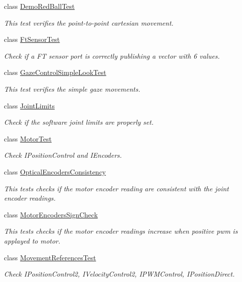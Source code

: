 \begin{DoxyCompactItemize}
class \hyperlink{classDemoRedBallTest}{Demo\+Red\+Ball\+Test}
\begin{DoxyCompactList}\small\item\em This test verifies the point-\/to-\/point cartesian movement. \end{DoxyCompactList}\item 
class \hyperlink{classFtSensorTest}{Ft\+Sensor\+Test}
\begin{DoxyCompactList}\small\item\em Check if a FT sensor port is correctly publishing a vector with 6 values. \end{DoxyCompactList}\item 
class \hyperlink{classGazeControlSimpleLookTest}{Gaze\+Control\+Simple\+Look\+Test}
\begin{DoxyCompactList}\small\item\em This test verifies the simple gaze movements. \end{DoxyCompactList}\item 
class \hyperlink{classJointLimits}{Joint\+Limits}
\begin{DoxyCompactList}\small\item\em Check if the software joint limits are properly set. \end{DoxyCompactList}\item 
class \hyperlink{classMotorTest}{Motor\+Test}
\begin{DoxyCompactList}\small\item\em Check I\+Position\+Control and I\+Encoders. \end{DoxyCompactList}\item 
class \hyperlink{classOpticalEncodersConsistency}{Optical\+Encoders\+Consistency}
\begin{DoxyCompactList}\small\item\em This tests checks if the motor encoder reading are consistent with the joint encoder readings. \end{DoxyCompactList}\item 
class \hyperlink{classMotorEncodersSignCheck}{Motor\+Encoders\+Sign\+Check}
\begin{DoxyCompactList}\small\item\em This tests checks if the motor encoder readings increase when positive pwm is applayed to motor. \end{DoxyCompactList}\item 
class \hyperlink{classMovementReferencesTest}{Movement\+References\+Test}
\begin{DoxyCompactList}\small\item\em Check I\+Position\+Control2, I\+Velocity\+Control2, I\+P\+W\+M\+Control, I\+Position\+Direct. \end{DoxyCompactList}\item 

\end{DoxyCompactItemize}
